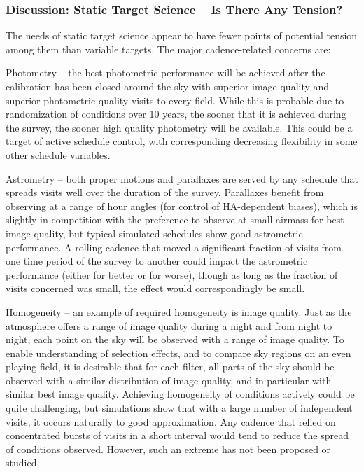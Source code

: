 
\subsubsection{Discussion: Static Target Science -- Is There Any Tension?}

The needs of static target science appear to have fewer points of
potential tension among them than variable targets.  The major
cadence-related concerns are:

\begin{description}

\item{Photometry} -- the best photometric performance will be achieved
after the calibration has been closed around the sky with superior image
quality and superior photometric quality visits to every field.  While
this is probable due to randomization of conditions over 10 years, the
sooner that it is achieved during the survey, the sooner high quality
photometry will be available.  This could be a target of active schedule
control, with corresponding decreasing flexibility in some other
schedule variables.

\item{Astrometry} -- both proper motions and parallaxes are served by
any schedule that spreads visits well over the duration of the survey.
Parallaxes benefit from observing at a range of hour angles (for control of HA-dependent biases),
which is slightly in competition with the preference to observe at small airmass
for best image quality, but typical simulated schedules show good
astrometric performance. A rolling cadence that moved a significant
fraction of visits from one time period of the survey to another could
impact the astrometric performance (either for better or for worse),
though as long as the fraction of visits concerned was small, the effect
would correspondingly be small.

\item{Homogeneity} -- an  example of required homogeneity is image
quality. Just as the atmosphere offers a range of image quality during a
night and from night to night, each point on the sky will be observed
with a range of image quality.  To enable understanding of selection
effects, and to compare sky regions on an even playing field, it is
desirable that for each filter, all parts of the sky should be observed
with a similar distribution of image quality, and in particular with
similar best image quality. Achieving homogeneity of conditions actively
could be quite challenging, but simulations show that with a large
number of independent visits, it occurs naturally to good approximation.
Any cadence that relied on concentrated bursts of visits in a short
interval would tend to reduce the spread of conditions observed.
However, such an extreme has not been proposed or studied.


\end{description}
